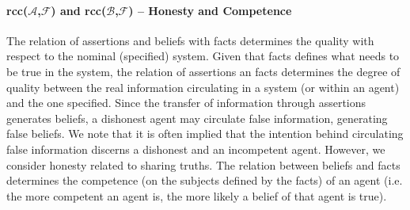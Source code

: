 \documentclass[conference]{IEEEtran}
\newcommand{\assertionRegion}{\mathcal{A}}
\newcommand{\beliefRegion}{\mathcal{B}}
\newcommand{\factRegion}{\mathcal{F}}
\newcommand{\Rcc}[2]{rcc(#1,#2)}
\begin{document}
\paragraph{\Rcc{$\assertionRegion$}{$\factRegion$} and
\Rcc{$\beliefRegion$}{$\factRegion$} -- Honesty and Competence} 
The relation of assertions
and beliefs with facts determines the quality with respect to the nominal
(specified) system.  Given that facts defines what needs to be true in the system,
the relation of assertions an facts determines the degree of quality between
the real information circulating in a system (or within an agent) and
the one specified.  Since the transfer of information
through assertions generates beliefs, a dishonest agent may circulate false
information, generating false beliefs.  We note that it is often implied that
the intention behind circulating false information discerns a dishonest and an
incompetent agent. However, we consider honesty related to sharing
truths.
The relation between beliefs and
facts determines the competence (on the subjects defined by the facts) of an
agent (i.e. the more competent an agent is, the more likely a belief of that
agent is true).
\end{document}
